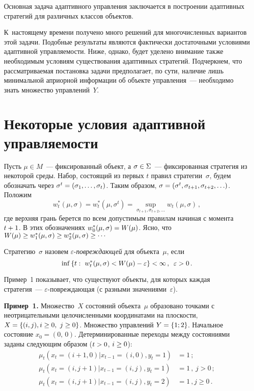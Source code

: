 \begin{multicols}{2}
  Основная задача адаптивного управления заключается в построении адаптивных 
стратегий для различных классов объектов. 

К~настоящему вре\-ме\-ни получено много 
решений для многочисленных вариантов этой задачи. Подобные результаты являются 
фактически достаточными условиями адаптивной управ\-ля\-емости. Ниже, однако, будет 
уделено внимание также необходимым условиям существования адаптивных стратегий. 
Подчеркнем, что рассматриваемая постановка задачи предполагает, по сути, наличие 
лишь минимальной априорной информации об объекте управления~--- необходимо знать 
множество управлений~$Y$.

\section{Некоторые условия адаптивной управляемости}

  Пусть $\mu\in M$~--- фиксированный объект, а $\sigma\hm\in \Sigma$~--- 
фиксированная стратегия из некоторой среды. Набор, состоящий из первых $t$ правил 
стратегии~$\sigma$, будем обозначать через $\sigma^t\hm=(\sigma_1, \ldots , \sigma_t)$. 
Таким образом, $\sigma\hm=(\sigma^t, \sigma_{t+1},\sigma_{t+2}, \ldots)$. Положим
  $$
  w_t^*(\mu,\sigma) =w_t^*(\mu,\sigma^t)=\sup\limits_{\sigma_{t+1},\sigma_{t+2}, \ldots} 
w_t(\mu,\sigma)\,,
  $$
где верхняя грань берется по всем допустимым правилам начиная с момента $t\hm+1$. В 
этих обозначениях $w_0^*(\mu,\sigma) \hm=W(\mu)$. Ясно, что $W(\mu)\hm\geq 
w_1^*(\mu,\sigma)\hm\geq w_2^*(\mu,\sigma)\geq \cdots$
  
  Стратегию~$\sigma$ назовем $\varepsilon$-\textit{по\-вреж\-да\-ющей} для 
объекта~$\mu$, если
  $$
  \inf\left\{ t:\ w_t^*(\mu,\sigma)<W(\mu)-\varepsilon\right\} <\infty\,,\enskip \varepsilon>0\,.
  $$
  
  Пример~1 показывает, что существуют объекты, для которых каждая стратегия~--- 
$\varepsilon$-по\-вреж\-да\-ющая (с разными значениями~$\varepsilon$).
  
  \medskip
  
  \noindent
  \textbf{Пример~1.} Множество~$X$ состояний объекта~$\mu$ образовано точками с 
неотрицательными целочисленными координатами на плоскости, $X\hm=\{ (i,j), 
i\hm\geq0,\ j\hm\geq0\}$. Множество управлений $Y\hm=\{1;2\}$. Начальное состояние 
$x_0=(0,\,0)$. Детерминированные переходы между состояниями заданы следующим 
образом ($t\hm>0$, $i\hm\geq0$):
  \begin{align*}
  \mu_t\left( x_t=(i+1{,}0)\vert x_{t-1}=(i,0),y_t=1\right)&=1\,;\\
  \mu_t\left( x_t=(i,j+1)\vert x_{t-1}=(i,j),y_t=1\right)&=1\,,\ j>0\,;\\
  \mu_t\left( x_t=(i,j+1)\vert x_{t-1}=(i,j),y_t=2\right)&=1\,, j\geq 0\,.
  \end{align*}
  

\end{multicols}
